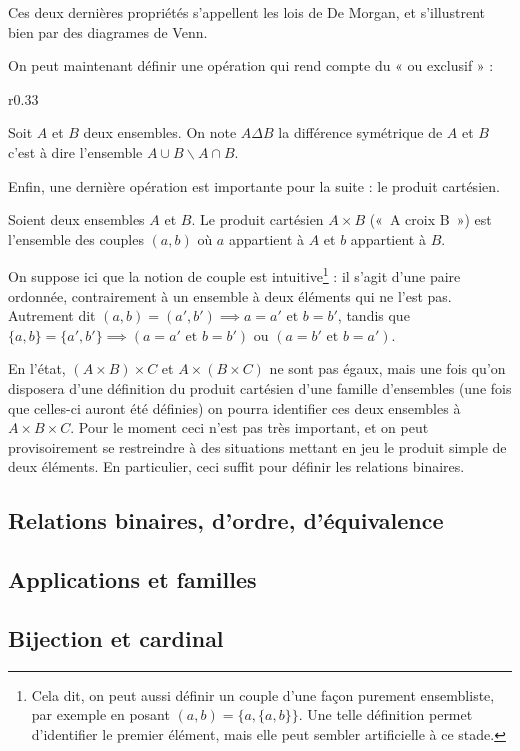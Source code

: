 Ces deux dernières propriétés s'appellent les lois de De Morgan, et s'illustrent bien par des diagrames de Venn.

\medskip
{}


\medskip
On peut maintenant définir une opération qui rend compte du « ou exclusif » :
\begin{wrapfigure}[2]{r}{0.33\textwidth}
    \vspace{-0.5em}
\end{wrapfigure}

\vspace{-1em}
\begin{defini}
    Soit $A$ et $B$ deux ensembles. On note $A\Delta B$ la différence symétrique de $A$ et $B$ c'est à dire l'ensemble $A\cup B \backslash A\cap B$.
\end{defini}

Enfin, une dernière opération est importante pour la suite : le produit cartésien. 

\begin{defini}
Soient deux ensembles $A$ et $B$. Le produit cartésien $A\times B$ («~A croix B~») est l'ensemble des couples $(a,b)$ où $a$ appartient à $A$ et $b$ appartient à $B$.
\end{defini}

On suppose ici que la notion de couple est intuitive\footnote{Cela dit, on peut aussi définir un couple d'une façon purement ensembliste, par exemple en posant $(a,b)=\{a, \{a, b\}\}$. Une telle définition permet d'identifier le premier élément, mais elle peut sembler artificielle à ce stade.} : il s'agit d'une paire ordonnée, contrairement à un ensemble à deux éléments qui ne l'est pas. Autrement dit $(a,b)=(a',b')\implies a=a' \text{ et } b=b'$, tandis que $\{a,b\}=\{a',b'\}\implies (a=a' \text{ et } b=b') \text{ ou } (a=b' \text{ et } b=a')$. 

En l'état, $(A\times B)\times C$ et $A\times (B\times C)$ ne sont pas égaux, mais une fois qu'on disposera d'une définition du produit cartésien d'une famille d'ensembles (une fois que celles-ci auront été définies) on pourra identifier ces deux ensembles à $A\times B \times C$. Pour le moment ceci n'est pas très important, et on peut provisoirement se restreindre à des situations mettant en jeu le produit simple de deux éléments. En particulier, ceci suffit pour définir les relations binaires.

\subsection*{Relations binaires, d'ordre, d'équivalence}
\subsection*{Applications et familles}
\subsection*{Bijection et cardinal}